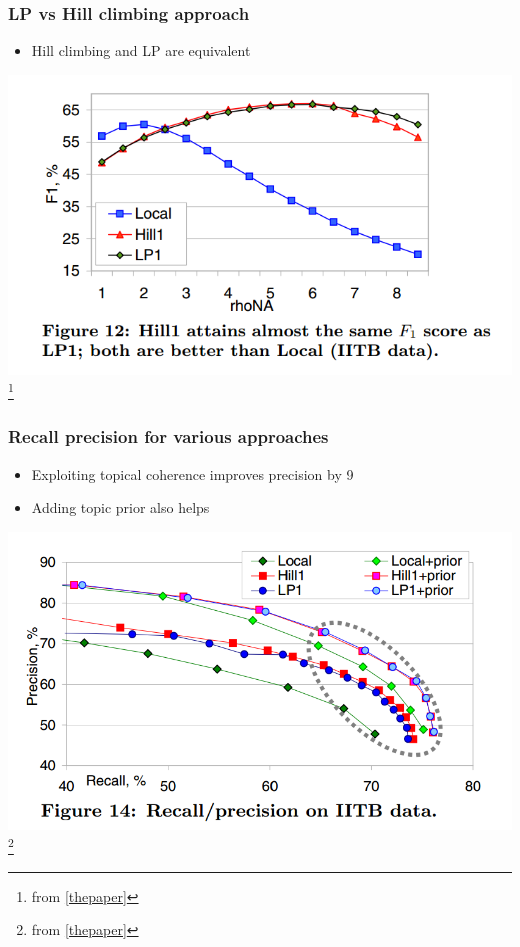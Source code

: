 \begin{frame}
  \frametitle{LP vs Hill climbing approach}
  \begin{itemize}
   \item Hill climbing and LP are equivalent
  \end{itemize}

  \begin{center}
  \includegraphics[height = 5 cm]{hillversuslp}\footnote{from \ref{thepaper}}
  \end{center}
 \end{frame}

 
\begin{frame}
  \frametitle{Recall precision for various approaches}
  \begin{itemize}
   \item Exploiting topical coherence improves precision by 9%
   \item Adding topic prior also helps
  \end{itemize}

  \begin{center}
  \includegraphics[height = 5 cm]{overall}\footnote{from \ref{thepaper}}
  \end{center}
 \end{frame}